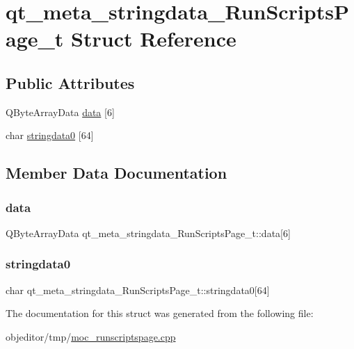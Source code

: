 \hypertarget{structqt__meta__stringdata___run_scripts_page__t}{}\section{qt\+\_\+meta\+\_\+stringdata\+\_\+\+Run\+Scripts\+Page\+\_\+t Struct Reference}
\label{structqt__meta__stringdata___run_scripts_page__t}
\subsection*{Public Attributes}
\begin{DoxyCompactItemize}
\item 
Q\+Byte\+Array\+Data \mbox{\hyperlink{structqt__meta__stringdata___run_scripts_page__t_a96298a03e510a30a114bbfe8988e12d4}{data}} \mbox{[}6\mbox{]}
\item 
char \mbox{\hyperlink{structqt__meta__stringdata___run_scripts_page__t_ae64507a47228de7177381ee86bb546ac}{stringdata0}} \mbox{[}64\mbox{]}
\end{DoxyCompactItemize}


\subsection{Member Data Documentation}
\mbox{\label{structqt__meta__stringdata___run_scripts_page__t_a96298a03e510a30a114bbfe8988e12d4}} 
\subsubsection{\texorpdfstring{data}{data}}
{\footnotesize\ttfamily Q\+Byte\+Array\+Data qt\+\_\+meta\+\_\+stringdata\+\_\+\+Run\+Scripts\+Page\+\_\+t\+::data\mbox{[}6\mbox{]}}

\mbox{\label{structqt__meta__stringdata___run_scripts_page__t_ae64507a47228de7177381ee86bb546ac}} 
\subsubsection{\texorpdfstring{stringdata0}{stringdata0}}
{\footnotesize\ttfamily char qt\+\_\+meta\+\_\+stringdata\+\_\+\+Run\+Scripts\+Page\+\_\+t\+::stringdata0\mbox{[}64\mbox{]}}



The documentation for this struct was generated from the following file\+:\begin{DoxyCompactItemize}
\item 
objeditor/tmp/\mbox{\hyperlink{moc__runscriptspage_8cpp}{moc\+\_\+runscriptspage.\+cpp}}\end{DoxyCompactItemize}
